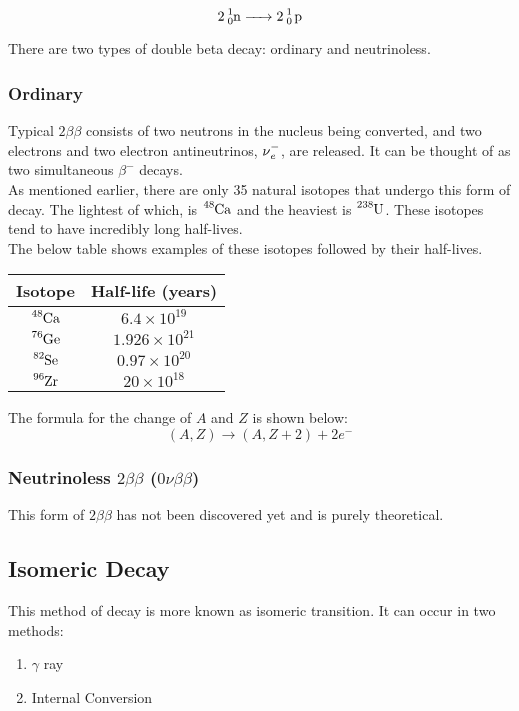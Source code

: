 \documentclass{article}
\begin{document}
\begin{multicols*}{2}
    \[
      \ce{2 ^{1}_{0}n -> 2 ^{1}_{0} p}
    \]

    There are two types of double beta decay: ordinary and neutrinoless.

    \subsubsection{Ordinary}
    Typical $2\beta\beta$ consists of two neutrons in the nucleus being converted,
    and two electrons and two electron antineutrinos, $\ce{\nu^{-}_{e}}$,
    are released. It can be thought of as two simultaneous $\beta^{-}$ decays.\\

    As mentioned earlier, there are only 35 natural isotopes that undergo
    this form of decay. The lightest of which, is $\ce{^{48}Ca}$ and the heaviest
    is $\ce{^{238}U}$. These isotopes tend to have incredibly long half-lives.\\

    The below table shows examples of these isotopes followed by their half-lives.\\
    
    \begin{tabular}{|c|c|}
      \hline
      \textbf{Isotope} & \textbf{Half-life (years)} \\
      \hline
      $\ce{^{48}Ca}$ & $6.4 \times 10^{19}$ \\
      $\ce{^{76}Ge}$ & $1.926 \times 10^{21}$ \\
      $\ce{^{82}Se}$ & $0.97 \times 10^{20}$ \\
      $\ce{^{96}Zr}$ & $20 \times 10^{18}$ \\
      \hline
    \end{tabular}

    The formula for the change of $A$ and $Z$ is shown below:
    \[
      \left(A, Z\right) \rightarrow \left(A, Z + 2\right) + 2e^{-}
    \]

    \subsubsection{Neutrinoless $2\beta\beta$ ($0\nu\beta\beta$)}
    This form of $2\beta\beta$ has not been discovered yet and is purely theoretical.
      

    \subsection{Isomeric Decay}
    This method of decay is more known as isomeric transition. It can occur
    in two methods:
    \begin{enumerate}
      \item $\gamma$ ray
      \item Internal Conversion
    \end{enumerate}

\end{multicols*}
\end{document}
